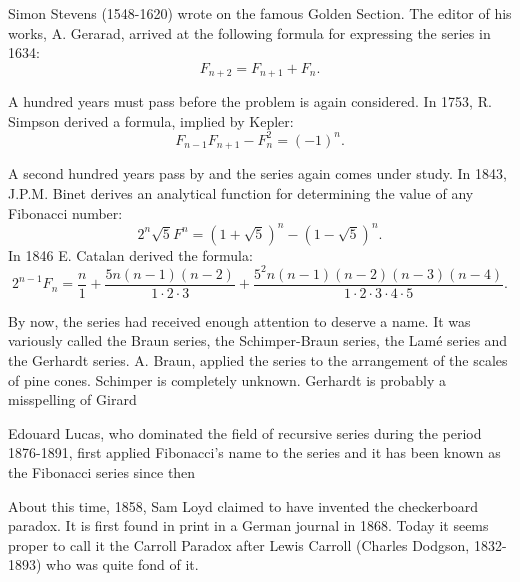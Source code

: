 \documentclass[10pt,]{book}
\theoremstyle{plain}
\theoremstyle{definition}
\begin{document}
Simon Stevens (1548-1620) wrote on the famous Golden Section.  The editor of his works, A. Gerarad, arrived at the following formula for expressing the series in 1634:%
\begin{equation*}
F_{n + 2} = F_{n + 1} + F_{n}.
\end{equation*}
%
\par
A hundred years must pass before the problem is again considered. In 1753, R. Simpson derived a formula, implied by Kepler:%
\begin{equation*}
F_{n - 1}F_{n + 1} - F_{n}^{2} = \left( - 1 \right)^{n}.
\end{equation*}
%
\par
A second hundred years pass by and the series again comes under study. In 1843, J.P.M. Binet derives an analytical function for determining the value of any Fibonacci number:%
\begin{equation*}
2^n \sqrt{5} F^n = (1 + \sqrt{5})^{n} - (1 - \sqrt{5})^{n}.
\end{equation*}
In 1846 E. Catalan derived the formula:%
\begin{equation*}
2^{n - 1}F_{n} = \frac{n}{1} + \frac{5n\left( n - 1 \right)\left( n - 2 \right)}{1 \cdot 2 \cdot 3} + \frac{5^{2}n\left( n - 1 \right)\left( n - 2 \right)\left( n - 3 \right)\left( n - 4 \right)}{1 \cdot 2 \cdot 3 \cdot 4 \cdot 5}.
\end{equation*}
%
\par
By now, the series had received enough attention to deserve a name. It was variously called the Braun series, the Schimper-Braun series, the Lamé series and the Gerhardt series. A. Braun, applied the series to the arrangement of the scales of pine cones. Schimper is completely unknown. Gerhardt is probably a misspelling of Girard%
\par
Edouard Lucas, who dominated the field of recursive series during the period 1876-1891, first applied Fibonacci's name to the series and it has been known as the Fibonacci series since then%
\par
About this time, 1858, Sam Loyd claimed to have invented the checkerboard paradox. It is first found in print in a German journal in 1868. Today it seems proper to call it the Carroll Paradox after Lewis Carroll (Charles Dodgson, 1832-1893) who was quite fond of it.%
\typeout{************************************************}
\typeout{************************************************}
\end{document}
